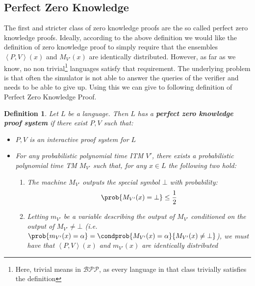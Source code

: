 \documentclass{article}
\newtheorem{definition}{Definition}
\begin{document}
\subsection{Perfect Zero Knowledge}
The first and stricter class of zero knowledge proofs are the so called perfect zero knowledge proofs. Ideally, according to the above definition we would like the definition of zero knowledge proof to simply require that the ensembles $\left<P, V\right>(x)$ and $M_{V'}(x)$ are identically distributed. However, as far as we know, no non trivial\footnote{Here, trivial means in $\mathcal{BPP}$, as every language in that class trivially satisfies the definition} languages satisfy that requirement. The underlying problem is that often the simulator is not able to answer the queries of the verifier and needs to be able to give up. Using this we can give to following definition of Perfect Zero Knowledge Proof.
\begin{definition}
Let $L$ be a language. Then $L$ has a \textbf{perfect zero knowledge proof system} if there exist $P, V$ such that:
\begin{itemize}
    \item $P, V$ is an interactive proof system for $L$
    \item For any probabilistic polynomial time ITM $V'$, there exists a probabilistic polynomial time TM $M_{V'}$ such that, for any $x \in L$ the following two hold:
    \begin{enumerate}
        \item The machine $M_{V'}$ outputs the special symbol $\bot$ with probability: \[\prob{M_{V'}(x) = \bot} \leq \frac{1}{2}\]
        \item Letting $m_{V'}$ be a variable describing the output of $M_{V'}$ conditioned on the output of $M_{V'} \neq \bot$ (i.e. $\prob{m_{V'}(x) = \alpha} = \condprob{M_{V'}(x) = \alpha}{M_{V'}(x) \neq \bot}$), we must have that $\left<P, V\right>(x)$ and $m_{V'}(x)$ are identically distributed
    \end{enumerate}
\end{itemize}
\end{definition}
\end{document}
